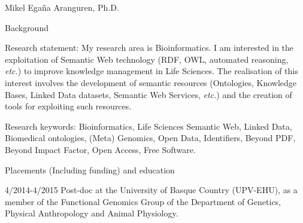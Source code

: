 \documentclass[english,11pt,a4paper,oneside]{article}
\newcommand{\etc}{\emph{etc.}}
\newcommand{\todo}[1]{\textbf{{\color{blue}$\Longrightarrow$ #1}}}
\begin{document}
\begin{cv}{Mikel Ega\~na Aranguren, Ph.D. }
 
 \begin{cvlist}{Background}
 	\item [Research statement:] My research area is Bioinformatics. I am interested in the exploitation of Semantic Web technology (RDF, OWL, automated reasoning, \etc) to improve knowledge management in Life Sciences. The realisation of this interest involves the development of semantic resources (Ontologies, Knowledge Bases, Linked Data datasets, Semantic Web Services, \etc) and the creation of tools for exploiting such resources.  
	 \item [Research keywords:] Bioinformatics, Life Sciences Semantic Web, Linked Data, Biomedical ontologies, (Meta) Genomics, Open Data, Identifiers, Beyond PDF, Beyond Impact Factor, Open Access, Free Software.
\end{cvlist}
 
\begin{cvlist}{Placements (Including funding) and education }

	
% 


	\item [4/2014-4/2015] Post-doc at the University of Basque Country (UPV-EHU), as a member of the Functional Genomics Group of the Department of Genetics, Physical Anthropology and Animal Physiology.


\end{cvlist}
\end{cv}
\end{document}
